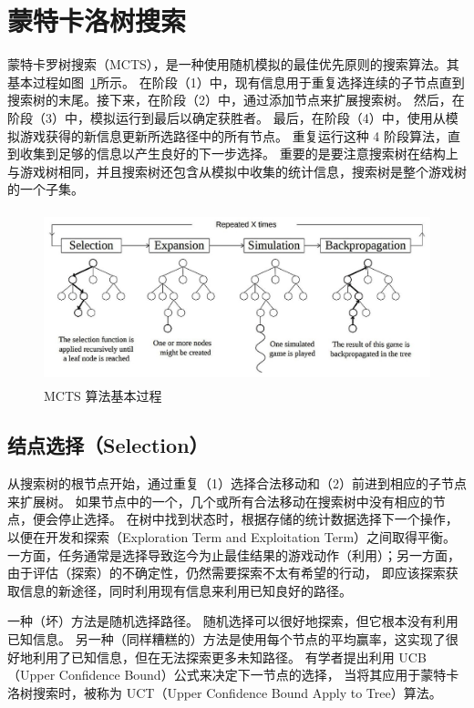\documentclass[UTF8,cs4size]{ctexart}
\begin{document}
\section{蒙特卡洛树搜索}
蒙特卡罗树搜索（MCTS），是一种使用随机模拟的最佳优先原则的搜索算法。其基本过程如图~\ref{fig:mcts_phase}所示。
在阶段（1）中，现有信息用于重复选择连续的子节点直到搜索树的末尾。接下来，在阶段（2）中，通过添加节点来扩展搜索树。
然后，在阶段（3）中，模拟运行到最后以确定获胜者。
最后，在阶段（4）中，使用从模拟游戏获得的新信息更新所选路径中的所有节点。
重复运行这种 4 阶段算法，直到收集到足够的信息以产生良好的下一步选择。
重要的是要注意搜索树在结构上与游戏树相同，并且搜索树还包含从模拟中收集的统计信息，搜索树是整个游戏树的一个子集。

\begin{figure}[htb]
  \centering
  \includegraphics[width=\textwidth,height=5cm]{figures/final_mcts_phase.png}
  \caption{MCTS 算法基本过程\cite{DBLP:conf/aiide/ChaslotBSS08}}
  \label{fig:mcts_phase}
\end{figure}

\subsection{结点选择（Selection）}
从搜索树的根节点开始，通过重复（1）选择合法移动和（2）前进到相应的子节点来扩展树。
如果节点中的一个，几个或所有合法移动在搜索树中没有相应的节点，便会停止选择。
在树中找到状态时，根据存储的统计数据选择下一个操作，以便在开发和探索（Exploration Term and Exploitation Term）之间取得平衡。
一方面，任务通常是选择导致迄今为止最佳结果的游戏动作（利用）；另一方面，由于评估（探索）的不确定性，仍然需要探索不太有希望的行动，
即应该探索获取信息的新途径，同时利用现有信息来利用已知良好的路径。

一种（坏）方法是随机选择路径。 随机选择可以很好地探索，但它根本没有利用已知信息。
另一种（同样糟糕的）方法是使用每个节点的平均赢率，这实现了很好地利用了已知信息，但在无法探索更多未知路径。
有学者提出利用 UCB（Upper Confidence Bound）公式来决定下一节点的选择\cite{DBLP:conf/ecml/KocsisS06}，
当将其应用于蒙特卡洛树搜索时，被称为 UCT（Upper Confidence Bound Apply to Tree）算法。
\end{document}
